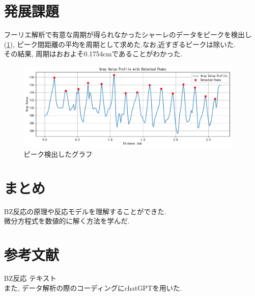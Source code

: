 \documentclass[11pt]{ltjsarticle}
\begin{document}
    \section*{発展課題}
      フーリエ解析で有意な周期が得られなかったシャーレのデータをピークを検出し(\cref{fig:peak}), ピーク間距離の平均を周期として求めた.なお,近すぎるピークは除いた.\\
      その結果, 周期はおおよそ0.1754cmであることがわかった.
      \begin{figure}[H]
        \centering
        \includegraphics[width=0.7\columnwidth]{prominent_peaks.pdf}
        \caption{ピーク検出したグラフ}
        \label{fig:peak}
      \end{figure}
  \section*{まとめ}
    \noindent BZ反応の原理や反応モデルを理解することができた. \\
    微分方程式を数値的に解く方法を学んだ.
  \section*{参考文献}
    \noindent BZ反応 テキスト\\
    また, データ解析の際のコーディングにchatGPTを用いた.
\end{document}
